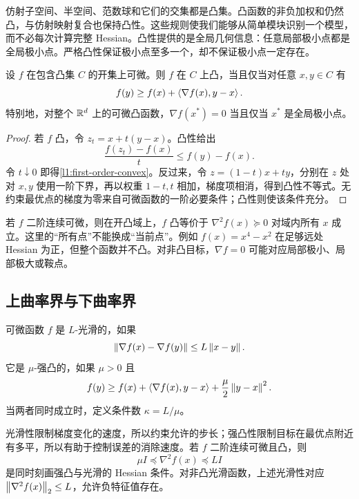 仿射子空间、半空间、范数球和它们的交集都是凸集。凸函数的非负加权和仍然凸，与仿射映射复合也保持凸性。这些规则使我们能够从简单模块识别一个模型，而不必每次计算完整 Hessian。凸性提供的是全局几何信息：任意局部极小点都是全局极小点。严格凸性保证极小点至多一个，却不保证极小点一定存在。

\begin{proposition}[可微凸函数的一阶刻画]
\label{l1:prop-convex-first}
设 $f$ 在包含凸集 $C$ 的开集上可微。则 $f$ 在 $C$ 上凸，当且仅当对任意 $x,y\in C$ 有
\begin{equation}
 f(y)\geq f(x)+\left\langle\nabla f(x),y-x\right\rangle.
 \label{l1:first-order-convex}
\end{equation}
特别地，对整个 $\mathbb R^d$ 上的可微凸函数，$\nabla f(x^*)=0$ 当且仅当 $x^*$ 是全局极小点。
\end{proposition}

\begin{proof}
若 $f$ 凸，令 $z_t=x+t(y-x)$。凸性给出
\[
 \frac{f(z_t)-f(x)}t\leq f(y)-f(x).
\]
令 $t\downarrow0$ 即得\eqref{l1:first-order-convex}。反过来，令 $z=(1-t)x+ty$，分别在 $z$ 处对 $x,y$ 使用一阶下界，再以权重 $1-t,t$ 相加，梯度项相消，得到凸性不等式。无约束最优点的梯度为零来自可微函数的一阶必要条件；凸性则使该条件充分。
\end{proof}

若 $f$ 二阶连续可微，则在开凸域上，$f$ 凸等价于 $\nabla^2f(x)\succeq0$ 对域内所有 $x$ 成立。这里的“所有点”不能换成“当前点”。例如 $f(x)=x^4-x^2$ 在足够远处 Hessian 为正，但整个函数并不凸。对非凸目标，$\nabla f=0$ 可能对应局部极小、局部极大或鞍点。

\subsection{上曲率界与下曲率界}

\begin{definition}[光滑与强凸]
可微函数 $f$ 是 $L$-光滑的，如果
\[
 \left\lVert\nabla f(x)-\nabla f(y)\right\rVert\leq L\left\lVert x-y\right\rVert.
\]
它是 $\mu$-强凸的，如果 $\mu>0$ 且
\begin{equation}
 f(y)\geq f(x)+\left\langle\nabla f(x),y-x\right\rangle
             +\frac\mu2\left\lVert y-x\right\rVert^2.
 \label{l1:strong-convex}
\end{equation}
当两者同时成立时，定义条件数 $\kappa=L/\mu$。
\end{definition}

光滑性限制梯度变化的速度，所以约束允许的步长；强凸性限制目标在最优点附近有多平，所以有助于控制误差的消除速度。若 $f$ 二阶连续可微且凸，则
\[
 \mu I\preceq\nabla^2f(x)\preceq LI
\]
是同时刻画强凸与光滑的 Hessian 条件。对非凸光滑函数，上述光滑性对应 $\left\lVert\nabla^2f(x)\right\rVert_2\leq L$，允许负特征值存在。

